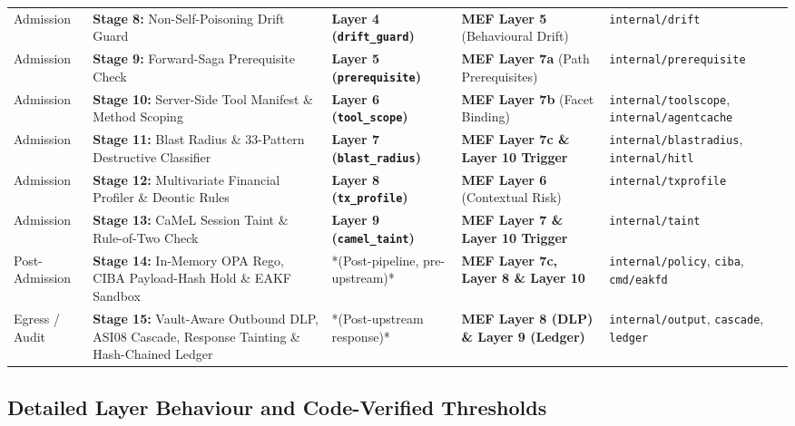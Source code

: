 \documentclass[11pt, a4paper]{article}
\begin{document}
\begin{small}
\begin{longtable}{@{} p{2.2cm} p{3.8cm} p{3.0cm} p{3.2cm} p{3.2cm} @{}}
\addlinespace
Admission & \textbf{Stage 8:} Non-Self-Poisoning Drift Guard & \textbf{Layer 4 (\texttt{drift\_guard})} & \textbf{MEF Layer 5} (Behavioural Drift) & \texttt{internal/drift} \\
\addlinespace
Admission & \textbf{Stage 9:} Forward-Saga Prerequisite Check & \textbf{Layer 5 (\texttt{prerequisite})} & \textbf{MEF Layer 7a} (Path Prerequisites) & \texttt{internal/prerequisite} \\
\addlinespace
Admission & \textbf{Stage 10:} Server-Side Tool Manifest \& Method Scoping & \textbf{Layer 6 (\texttt{tool\_scope})} & \textbf{MEF Layer 7b} (Facet Binding) & \texttt{internal/toolscope}, \texttt{internal/agentcache} \\
\addlinespace
Admission & \textbf{Stage 11:} Blast Radius \& 33-Pattern Destructive Classifier & \textbf{Layer 7 (\texttt{blast\_radius})} & \textbf{MEF Layer 7c \& Layer 10 Trigger} & \texttt{internal/blastradius}, \texttt{internal/hitl} \\
\addlinespace
Admission & \textbf{Stage 12:} Multivariate Financial Profiler \& Deontic Rules & \textbf{Layer 8 (\texttt{tx\_profile})} & \textbf{MEF Layer 6} (Contextual Risk) & \texttt{internal/txprofile} \\
\addlinespace
Admission & \textbf{Stage 13:} CaMeL Session Taint \& Rule-of-Two Check & \textbf{Layer 9 (\texttt{camel\_taint})} & \textbf{MEF Layer 7 \& Layer 10 Trigger} & \texttt{internal/taint} \\
\addlinespace
Post-Admission & \textbf{Stage 14:} In-Memory OPA Rego, CIBA Payload-Hash Hold \& EAKF Sandbox & *(Post-pipeline, pre-upstream)* & \textbf{MEF Layer 7c, Layer 8 \& Layer 10} & \texttt{internal/policy}, \texttt{ciba}, \texttt{cmd/eakfd} \\
\addlinespace
Egress / Audit & \textbf{Stage 15:} Vault-Aware Outbound DLP, ASI08 Cascade, Response Tainting \& Hash-Chained Ledger & *(Post-upstream response)* & \textbf{MEF Layer 8 (DLP) \& Layer 9 (Ledger)} & \texttt{internal/output}, \texttt{cascade}, \texttt{ledger} \\
\end{longtable}
\end{small}

\subsection{Detailed Layer Behaviour and Code-Verified Thresholds}
\label{subsec:layer-details}
\end{document}
